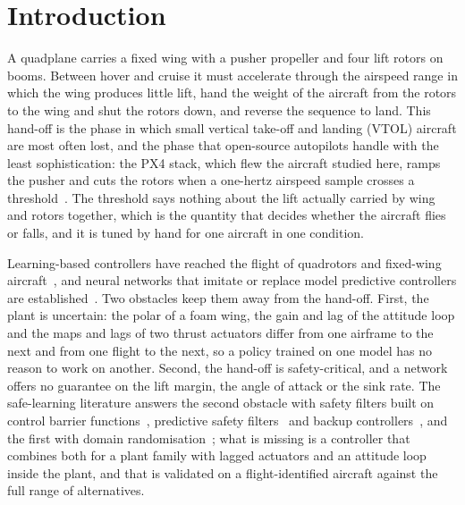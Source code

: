\documentclass[final,5p,times,twocolumn]{elsarticle}
\begin{document}
\section{Introduction}\label{sec:intro}
A quadplane carries a fixed wing with a pusher propeller and four lift rotors on booms. Between hover and cruise it must accelerate through the airspeed range in which the wing produces little lift, hand the weight of the aircraft from the rotors to the wing and shut the rotors down, and reverse the sequence to land. This hand-off is the phase in which small vertical take-off and landing (VTOL) aircraft are most often lost, and the phase that open-source autopilots handle with the least sophistication: the PX4 stack, which flew the aircraft studied here, ramps the pusher and cuts the rotors when a one-hertz airspeed sample crosses a threshold~\cite{Meier2015,PX4docs}. The threshold says nothing about the lift actually carried by wing and rotors together, which is the quantity that decides whether the aircraft flies or falls, and it is tuned by hand for one aircraft in one condition.

Learning-based controllers have reached the flight of quadrotors and fixed-wing aircraft~\cite{Kaufmann2023,Song2023}, and neural networks that imitate or replace model predictive controllers are established~\cite{Hertneck2018,Karg2020,Chen2018}. Two obstacles keep them away from the hand-off. First, the plant is uncertain: the polar of a foam wing, the gain and lag of the attitude loop and the maps and lags of two thrust actuators differ from one airframe to the next and from one flight to the next, so a policy trained on one model has no reason to work on another. Second, the hand-off is safety-critical, and a network offers no guarantee on the lift margin, the angle of attack or the sink rate. The safe-learning literature answers the second obstacle with safety filters built on control barrier functions~\cite{Ames2019}, predictive safety filters~\cite{Wabersich2021} and backup controllers~\cite{Gurriet2020}, and the first with domain randomisation~\cite{Tobin2017,Peng2018}; what is missing is a controller that combines both for a plant family with lagged actuators and an attitude loop inside the plant, and that is validated on a flight-identified aircraft against the full range of alternatives.
\end{document}

